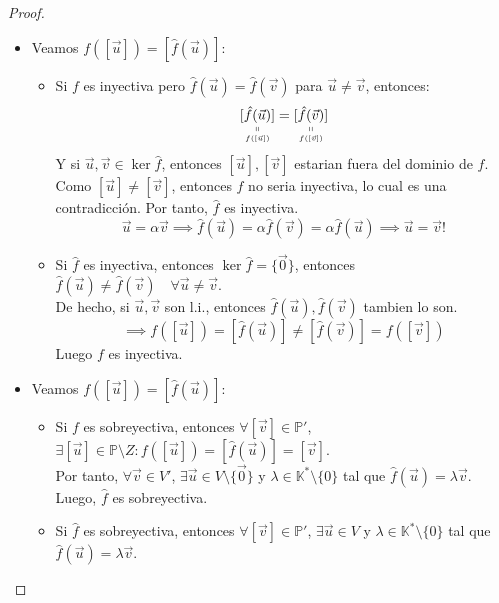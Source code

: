 \begin{proof}
    \leavevmode
    \begin{itemize}
        \item[1)] Veamos $f([\vec{u}]) = [\hat{f}(\vec{u})]$:
        \begin{itemize}
            \item[$\Rightarrow$)] Si $f$ es inyectiva pero $\hat{f} (\vec{u}) = \hat{f} (\vec{v})$ para $\vec{u} \neq \vec{v}$, entonces:
            \[
            \underset{\underset{f([\vec{u}])}{\shortparallel}}{[\hat{f}(\vec{u})]} = \underset{\underset{f([\vec{v}])}{\shortparallel}}{[\hat{f}(\vec{v})]}
            \]
            Y si $\vec{u}, \vec{v} \in \ker \hat{f}$, entonces $[\vec{u}], [\vec{v}]$ estarian fuera del dominio de $f$.\\
            Como $[\vec{u}] \neq [\vec{v}]$, entonces $f$ no seria inyectiva, lo cual es una contradicción. Por tanto, $\hat{f}$ es inyectiva.
            \[
            \vec{u} = \alpha \vec{v} \implies \hat{f}(\vec{u}) = \alpha \hat{f}(\vec{v}) = \alpha \hat{f}(\vec{u}) \implies \vec{u} = \vec{v} \text{!}
            \]
            \item[$\Leftarrow$)] Si $\hat{f}$ es inyectiva, entonces $\ker \hat{f} = \{\vec{0}\}$, entonces $\hat{f}(\vec{u}) \neq \hat{f} (\vec{v}) \quad \forall \vec{u} \neq \vec{v}$.\\
            De hecho, si $\vec{u}, \vec{v}$ son l.i., entonces $\hat{f}(\vec{u}), \hat{f} (\vec{v})$ tambien lo son.\\
            \[
            \implies f([\vec{u}]) = [\hat{f}(\vec{u})] \neq [\hat{f}(\vec{v})] = f([\vec{v}])
            \]
            Luego $f$ es inyectiva.
        \end{itemize}
        \item[2)] Veamos $f([\vec{u}]) = [\hat{f}(\vec{u})]$:
        \begin{itemize}
            \item[$\Rightarrow$)] Si $f$ es sobreyectiva, entonces $\forall [\vec{v}] \in \mathbb{P}'$, $\exists [\vec{u}] \in \mathbb{P} \setminus Z : f([\vec{u}]) = [\hat{f}(\vec{u})] = [\vec{v}]$.\\
            Por tanto, $\forall \vec{v} \in V'$, $\exists \vec{u} \in V \setminus \{\vec{0}\}$ y $\lambda \in \mathbb{K}^* \setminus \{0\}$ tal que $\hat{f}(\vec{u}) = \lambda \vec{v}$.\\
            Luego, $\hat{f}$ es sobreyectiva.
            \item[$\Leftarrow$)] Si $\hat{f}$ es sobreyectiva, entonces $\forall [\vec{v}] \in \mathbb{P}'$, $\exists \vec{u} \in V$ y $\lambda \in \mathbb{K}^* \setminus \{0\}$ tal que $\hat{f}(\vec{u}) = \lambda \vec{v}$.\\

\end{itemize}
\end{itemize}
\end{proof}
